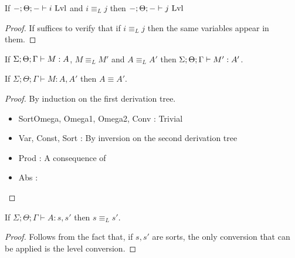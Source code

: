 \documentclass[]{StandardTemplate}
\begin{document}
\begin{prop}
If $ -;\Theta;- \vdash i~\text{Lvl} $ and $ i \equiv_L j $ then $ -; \Theta; - \vdash j~\text{Lvl} $
\end{prop}
\begin{proof}
If suffices to verify that if $ i \equiv_L j $ then the same variables appear in them.
\end{proof}

\begin{cor}
If $ {\Sigma;\Theta;\Gamma} \vdash M : A $, $ M \equiv_L M' $ and $ A \equiv_L A' $ then $ {\Sigma;\Theta;\Gamma} \vdash M' : A' $.
\end{cor}

\begin{prop}[]
If $ \Sigma; \Theta; \Gamma \vdash M : A, A' $ then $ A \equiv A' $.
\end{prop}
\begin{proof}
  By induction on the first derivation tree.
  \begin{itemize}
  \item SortOmega, Omega1, Omega2, Conv : Trivial
  \item Var, Const, Sort : By inversion on the second derivation tree
  \item Prod : A consequence of
  \item Abs : 
  \end{itemize}
\end{proof}

\begin{cor}
If $ \Sigma; \Theta; \Gamma \vdash A : s, s' $ then $ s \equiv_L s' $.
\end{cor}
\begin{proof}
Follows from the fact that, if $ s, s' $ are sorts, the only conversion that can be applied is the level conversion.
\end{proof}

\newcommand{\Nn}{\text{N}}
\end{document}
